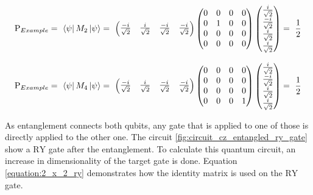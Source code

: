 \begin{equation}
    \centering
    \begin{split}
        \mathrm{P}_{Example} =\ \bra{\psi}M_2\ket{\psi} =\ \begin{pmatrix}
        \frac{-i}{\sqrt{2}} & \frac{i}{\sqrt{2}} & \frac{-i}{\sqrt{2}} & \frac{-i}{\sqrt{2}}
        \end{pmatrix}\begin{pmatrix}
        0 & 0 & 0 & 0 \\ 
        0 & 1 & 0 & 0 \\ 
        0 & 0 & 0 & 0\\ 
        0 & 0 & 0& 0\end{pmatrix}\begin{pmatrix}
        \frac{i}{\sqrt{2}} \\ \frac{-i}{\sqrt{2}} \\ \frac{i}{\sqrt{2}} \\ \frac{i}{\sqrt{2}}
        \end{pmatrix} =\ \frac{1}{2}
    \end{split}
    \label{equation:probability_calculation_example_1}
\end{equation}

\begin{equation}
    \centering
    \begin{split}
        \mathrm{P}_{Example} =\ \bra{\psi}M_4\ket{\psi} =\ \begin{pmatrix}
        \frac{-i}{\sqrt{2}} & \frac{i}{\sqrt{2}} & \frac{-i}{\sqrt{2}} & \frac{-i}{\sqrt{2}}
        \end{pmatrix}\begin{pmatrix}
        0 & 0 & 0 & 0 \\ 
        0 & 0 & 0 & 0 \\ 
        0 & 0 & 0 & 0\\ 
        0 & 0 & 0& 1\end{pmatrix}\begin{pmatrix}
        \frac{i}{\sqrt{2}} \\ \frac{-i}{\sqrt{2}} \\ \frac{i}{\sqrt{2}} \\ \frac{i}{\sqrt{2}}
        \end{pmatrix} =\ \frac{1}{2}
    \end{split}
    \label{equation:probability_calculation_example_2}
\end{equation}

As entanglement connects both qubits, any gate that is applied to one of those is directly applied to the other one. The circuit \ref{fig:circuit_cz_entangled_ry_gate} show a $\mathrm{RY}$ gate after the entanglement. To calculate this quantum circuit, an increase in dimensionality of the target gate is done. Equation \ref{equation:2_x_2_ry} demonstrates how the identity matrix is used on the $\mathrm{RY}$ gate.

